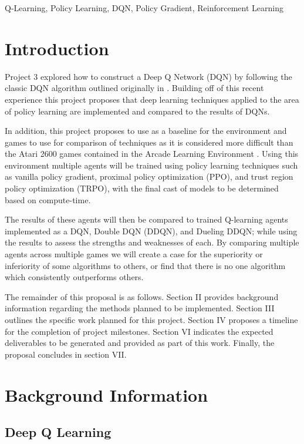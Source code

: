 \documentclass[conference]{IEEEtran}
\begin{document}
\begin{IEEEkeywords}
Q-Learning, Policy Learning, DQN, Policy Gradient, Reinforcement Learning
\end{IEEEkeywords}

\section{Introduction}
Project 3 explored how to construct a Deep Q Network (DQN) by following the classic DQN algorithm outlined originally in \cite{DQNOriginalPaper}.
Building off of this recent experience this project proposes that deep learning techniques applied to the area of policy learning are implemented and compared to the results of DQNs.

In addition, this project proposes to use \cite{nichol2018retro} as a baseline for the environment and games to use for comparison of techniques as it is considered more difficult than the Atari 2600 games contained in the Arcade Learning Environment \cite{Bellemare_2013}.
Using this environment multiple agents will be trained using policy learning techniques such as vanilla policy gradient, proximal policy optimization (PPO), and trust region policy optimization (TRPO), with the final cast of models to be determined based on compute-time.

The results of these agents will then be compared to trained Q-learning agents implemented as a DQN, Double DQN (DDQN), and Dueling DDQN; while using the results to assess the strengths and weaknesses of each. By comparing multiple agents across multiple games we will create a case for the superiority or inferiority of some algorithms to others, or find that there is no one algorithm which consistently outperforms others.

The remainder of this proposal is as follows.
Section II provides background information regarding the methods planned to be implemented.
Section III outlines the specific work planned for this project.
Section IV proposes a timeline for the completion of project milestones.
Section VI indicates the expected deliverables to be generated and provided as part of this work.
Finally, the proposal concludes in section VII.

\section{Background Information}

\subsection{Deep Q Learning}
\end{document}

